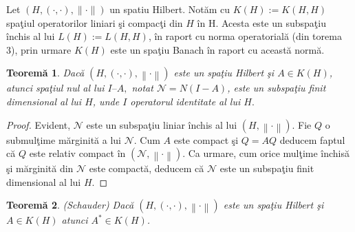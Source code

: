 \documentclass[a4paper,12pt,oneside]{report}
\newtheorem{theorem}{Teorem\u a}
\begin{document}
Let $(H, (\cdot, \cdot), \parallel\cdot\parallel)$ un spatiu Hilbert.
Not\u{a}m cu \(K\left ( H \right ):= K\left ( H,H \right )\) spa\c{t}iul operatorilor liniari \c{s}i compac\c{t}i din \(H\) \^{i}n H. Acesta este un subspa\c{t}iu \^{i}nchis al lui \(L\left ( H \right ):= L\left ( H,H \right )\), \^{i}n raport cu norma operatorial\u{a} (din torema 3), prin urmare \(K\left ( H \right )\) este un spa\c{t}iu Banach \^{i}n raport cu aceast\u{a} norm\u{a}.

\begin{theorem}
Dac\u{a} \(\left ( H, \left ( \cdot ,\cdot  \right ),\left \| \cdot  \right \| \right )\) este un spa\c{t}iu Hilbert \c{s}i \(A \in K\left ( H \right )\), atunci spa\c{t}iul nul al lui \(I – A,\) notat \({ \mathcal{N}} = N\left ( I - A \right )\), este un subspa\c{t}iu  finit dimensional al lui \(H\), unde \(I\) operatorul identitate al lui \(H. \)
\end{theorem}
\begin{proof}
Evident, \({ \mathcal{N}}\) este un subspa\c{t}iu liniar \^{i}nchis al lui \(\left ( H,\left \| \cdot  \right \| \right ).\) Fie \(Q\) o submul\c{t}ime m\u{a}rginit\u{a} a lui \({ \mathcal{N}}\). Cum \(A\) este compact \c{s}i \(Q = AQ\) deducem faptul c\u{a} \(Q\) este relativ compact \^{i}n \(\left ( { \mathcal{N}} ,\left \| \cdot  \right \| \right ).\) Ca urmare, cum orice mul\c{t}ime \^{i}nchis\u{a} \c{s}i m\u{a}rginit\u{a} din $\mathcal{N}$ este compact\u{a}, deducem c\u{a} $\mathcal{N}$ este un subspa\c{t}iu  finit dimensional al lui \(H\).
\end{proof}
\begin{theorem}(Schauder)
Dac\u{a} \(\left ( H, \left ( \cdot ,\cdot  \right ),\left \| \cdot  \right \| \right )\) este un spa\c{t}iu Hilbert \c{s}i \(A \in K\left ( H \right )\) atunci \(A^{\ast} \in K\left ( H \right )\).
\end{theorem}
\end{document}
